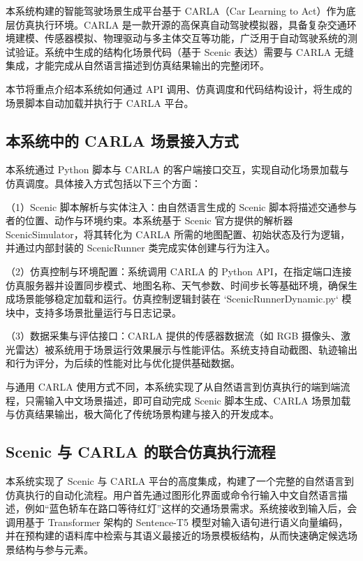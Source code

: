 本系统构建的智能驾驶场景生成平台基于 CARLA（Car Learning to Act）作为底层仿真执行环境。CARLA 是一款开源的高保真自动驾驶模拟器，具备复杂交通环境建模、传感器模拟、物理驱动与多主体交互等功能，广泛用于自动驾驶系统的测试验证。系统中生成的结构化场景代码（基于 Scenic 表达）需要与 CARLA 无缝集成，才能完成从自然语言描述到仿真结果输出的完整闭环。

本节将重点介绍本系统如何通过 API 调用、仿真调度和代码结构设计，将生成的场景脚本自动加载并执行于 CARLA 平台。

\subsection{本系统中的 CARLA 场景接入方式}

本系统通过 Python 脚本与 CARLA 的客户端接口交互，实现自动化场景加载与仿真调度。具体接入方式包括以下三个方面：


（1）Scenic 脚本解析与实体注入：由自然语言生成的 Scenic 脚本将描述交通参与者的位置、动作与环境约束。本系统基于 Scenic 官方提供的解析器 ScenicSimulator，将其转化为 CARLA 所需的地图配置、初始状态及行为逻辑，并通过内部封装的 ScenicRunner 类完成实体创建与行为注入。

（2）仿真控制与环境配置：系统调用 CARLA 的 Python API，在指定端口连接仿真服务器并设置同步模式、地图名称、天气参数、时间步长等基础环境，确保生成场景能够稳定加载和运行。仿真控制逻辑封装在 `ScenicRunnerDynamic.py` 模块中，支持多场景批量运行与日志记录。

（3）数据采集与评估接口：CARLA 提供的传感器数据流（如 RGB 摄像头、激光雷达）被系统用于场景运行效果展示与性能评估。系统支持自动截图、轨迹输出和行为评分，为后续的性能对比与优化提供基础数据。

与通用 CARLA 使用方式不同，本系统实现了从自然语言到仿真执行的端到端流程，只需输入中文场景描述，即可自动完成 Scenic 脚本生成、CARLA 场景加载与仿真结果输出，极大简化了传统场景构建与接入的开发成本。


\subsection{Scenic 与 CARLA 的联合仿真执行流程}

本系统实现了 Scenic 与 CARLA 平台的高度集成，构建了一个完整的自然语言到仿真执行的自动化流程。用户首先通过图形化界面或命令行输入中文自然语言描述，例如“蓝色轿车在路口等待红灯”这样的交通场景需求。系统接收到输入后，会调用基于 Transformer 架构的 Sentence-T5 模型对输入语句进行语义向量编码，并在预构建的语料库中检索与其语义最接近的场景模板结构，从而快速确定候选场景结构与参与元素。

